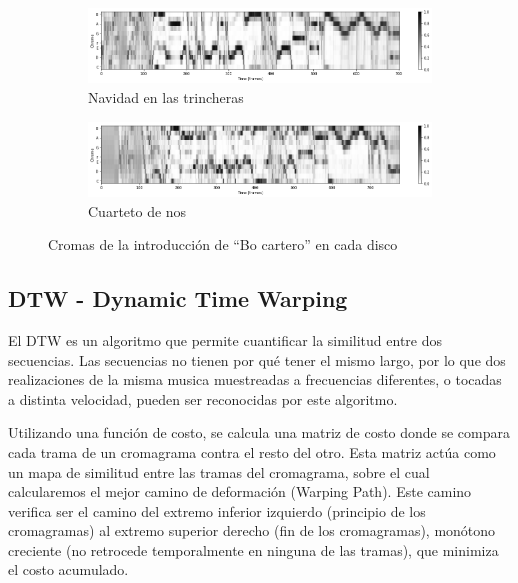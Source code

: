 \documentclass{article}
\begin{document}
\begin{figure}[htb]
    \centering
    \begin{subfigure}{\textwidth}
        \includegraphics[width=\textwidth]{chromas/bo_cartero_trama_crudo.png}
        \caption{Navidad en las trincheras}
    \end{subfigure}
    \begin{subfigure}{\textwidth}
        \includegraphics[width=\textwidth]{chromas/bo_cartero_trama_2_crudo.png}
        \caption{Cuarteto de nos}
    \end{subfigure}
    \caption{Cromas de la introducción de ``Bo cartero'' en cada disco}
    \label{fig:cromas_bo_cartero_ej}
\end{figure}

\subsection{DTW - Dynamic Time Warping}

El DTW es un algoritmo que permite cuantificar la similitud entre dos secuencias. Las secuencias no tienen por qué tener el mismo largo, por lo que dos realizaciones de la misma musica muestreadas a frecuencias diferentes, o tocadas a distinta velocidad, pueden ser reconocidas por este algoritmo. 

Utilizando una función de costo, se calcula una matriz de costo donde se compara cada trama de un cromagrama contra el resto del otro. Esta matriz actúa como un mapa de similitud entre las tramas del cromagrama, sobre el cual calcularemos el mejor camino de deformación (Warping Path). Este camino verifica ser el camino del extremo inferior izquierdo (principio de los cromagramas) al extremo superior derecho (fin de los cromagramas), monótono creciente (no retrocede temporalmente en ninguna de las tramas), que minimiza el costo acumulado. 
\end{document}
